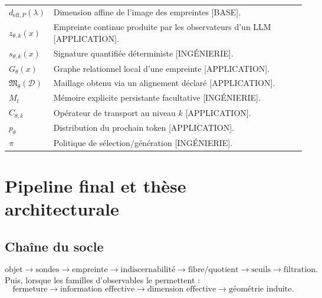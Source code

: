 \documentclass[11pt,a4paper]{article}
\theoremstyle{remark}
\newcommand{\D}{\mathcal D}
\newcommand{\Mesh}{\mathfrak M}
\begin{document}
\begin{longtable}{p{}p{}}
$d_{\mathrm{eff},P}(\lambda)$ & Dimension affine de l'image des empreintes [BASE].\\
$z_{\theta,k}(x)$ & Empreinte continue produite par les observateurs d'un LLM [APPLICATION].\\
$s_{\theta,k}(x)$ & Signature quantifiée déterministe [INGÉNIERIE].\\
$G_\theta(x)$ & Graphe relationnel local d'une empreinte [APPLICATION].\\
$\Mesh_\theta(\D)$ & Maillage obtenu via un alignement déclaré [APPLICATION].\\
$M_t$ & Mémoire explicite persistante facultative [INGÉNIERIE].\\
$C_{\theta,k}$ & Opérateur de transport au niveau $k$ [APPLICATION].\\
$p_\theta$ & Distribution du prochain token [APPLICATION].\\
$\pi$ & Politique de sélection/génération [INGÉNIERIE].\\
\bottomrule
\end{longtable}

\section{Pipeline final et thèse architecturale}

\subsection{Chaîne du socle}
\[
\boxed{
\text{objet}\to\text{sondes}\to\text{empreinte}\to\text{indiscernabilité}\to\text{fibre/quotient}\to\text{seuils}\to\text{filtration}.
}
\]
Puis, lorsque les familles d'observables le permettent :
\[
\boxed{\text{fermeture}\to\text{information effective}\to\text{dimension effective}\to\text{géométrie induite}.}
\]
\end{document}
